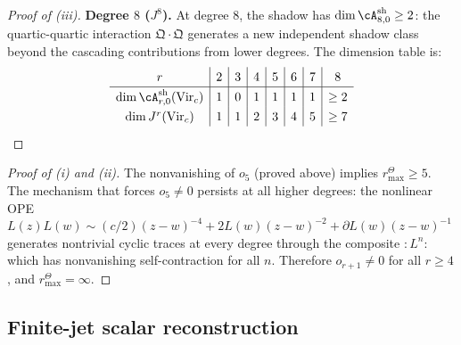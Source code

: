 \begin{proof}[Proof of {\textup{(iii)}}]
\medskip\noindent\textbf{Degree $8$ ($J^8$).}
At degree $8$, the shadow has $\dim \cA^{\mathrm{sh}}_{8,0} \geq 2$: the
quartic-quartic interaction $\mathfrak{Q} \cdot \mathfrak{Q}$ generates a new
independent shadow class beyond the cascading contributions from lower degrees.
The dimension table is:
\[
\renewcommand{\arraystretch}{1.3}
\begin{array}{c|c|c|c|c|c|c|c}
r & 2 & 3 & 4 & 5 & 6 & 7 & 8 \\
\hline
\dim \cA^{\mathrm{sh}}_{r,0}(\mathrm{Vir}_c) & 1 & 0 & 1 & 1 & 1 & 1 & \geq 2 \\
\dim J^r(\mathrm{Vir}_c) & 1 & 1 & 2 & 3 & 4 & 5 & \geq 7
\end{array}
\]
\end{proof}

\begin{proof}[Proof of {\textup{(i)}} and {\textup{(ii)}}]
The nonvanishing of $o_5$ (proved above) implies
\(r^\Theta_{\max} \geq 5\). The mechanism
that forces $o_5 \neq 0$ persists at all higher degrees: the nonlinear OPE
$L(z) L(w) \sim (c/2)(z-w)^{-4} + 2L(w)(z-w)^{-2} + \partial L(w)(z-w)^{-1}$
generates nontrivial cyclic traces at every degree through the composite
$:L^n:$ which has nonvanishing self-contraction for all $n$. Therefore
$o_{r+1} \neq 0$ for all $r \geq 4$, and
\(r^\Theta_{\max} = \infty\).
\end{proof}

\subsection{Finite-jet scalar reconstruction}

